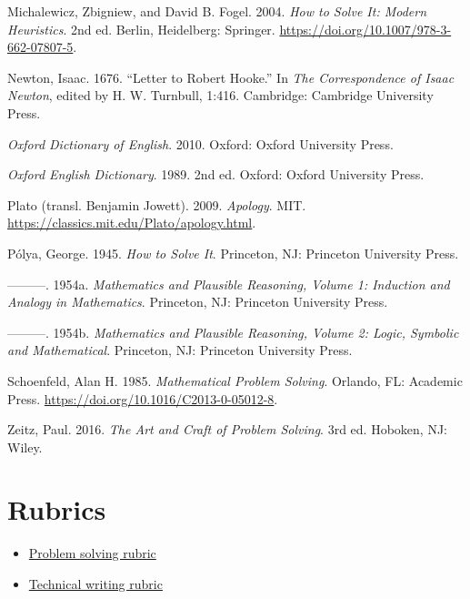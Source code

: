 \documentclass[
  a4paper,
  DIV=11,
  numbers=noendperiod,
  oneside]{scrreprt}
\newlength{\cslhangindent}
\newenvironment{CSLReferences}[2] %
 {\begin{list}{}{%
  \setlength{\itemindent}{0pt}
  \setlength{\leftmargin}{0pt}
  \setlength{\parsep}{0pt}
  \ifodd #1
   \setlength{\leftmargin}{\cslhangindent}
   \setlength{\itemindent}{-1\cslhangindent}
  \fi
  \setlength{\itemsep}{#2\baselineskip}}}
 {\end{list}}
\providecommand{\tightlist}{%
  \setlength{\itemsep}{0pt}\setlength{\parskip}{0pt}}
\begin{document}
\begin{CSLReferences}{1}{0}
Michalewicz, Zbigniew, and David B. Fogel. 2004. \emph{{How to Solve It:
Modern Heuristics}}. 2nd ed. Berlin, Heidelberg: Springer.
\url{https://doi.org/10.1007/978-3-662-07807-5}.

Newton, Isaac. 1676. {``Letter to Robert Hooke.''} In \emph{The
Correspondence of Isaac Newton}, edited by H. W. Turnbull, 1:416.
Cambridge: Cambridge University Press.

\emph{Oxford Dictionary of English}. 2010. Oxford: Oxford University
Press.

\emph{Oxford English Dictionary}. 1989. 2nd ed. Oxford: Oxford
University Press.

Plato (transl. Benjamin Jowett). 2009. \emph{Apology}. MIT.
\url{https://classics.mit.edu/Plato/apology.html}.

Pólya, George. 1945. \emph{{How to Solve It}}. Princeton, NJ: Princeton
University Press.

---------. 1954a. \emph{Mathematics and Plausible Reasoning, Volume 1:
Induction and Analogy in Mathematics}. Princeton, NJ: Princeton
University Press.

---------. 1954b. \emph{Mathematics and Plausible Reasoning, Volume 2:
Logic, Symbolic and Mathematical}. Princeton, NJ: Princeton University
Press.

Schoenfeld, Alan H. 1985. \emph{Mathematical Problem Solving}. Orlando,
FL: Academic Press. \url{https://doi.org/10.1016/C2013-0-05012-8}.

Zeitz, Paul. 2016. \emph{The Art and Craft of Problem Solving}. 3rd ed.
Hoboken, NJ: Wiley.

\end{CSLReferences}

\endgroup

\cleardoublepage
{}
{}
\appendix

\chapter{Rubrics}\label{rubrics}

\begin{itemize}
\tightlist
\item
  \href{rubric-problem-solving.pdf}{Problem solving rubric}
\item
  \href{rubric-writing.pdf}{Technical writing rubric}
\end{itemize}



\end{document}
